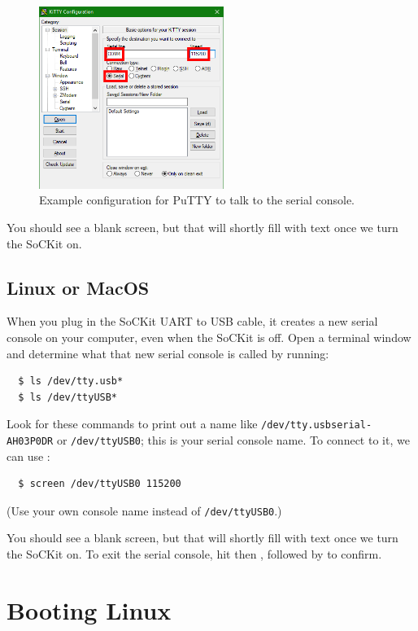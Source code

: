 \documentclass{sockitguide}
\begin{document}
\begin{figure}
  \includegraphics[width=6cm]{figures/putty.png}
  \caption{Example configuration for PuTTY to talk to the serial console.}
  \label{fig:putty}
\end{figure}

You should see a blank screen, but that will shortly fill with text
once we turn the SoCKit on.

\subsection{Linux or MacOS}

When you plug in the SoCKit UART to USB cable, it creates a new serial
console on your computer, even when the SoCKit is off. Open a terminal
window and determine what that new serial console is called by
running:
\begin{verbatim}
  $ ls /dev/tty.usb*
  $ ls /dev/ttyUSB*
\end{verbatim}

Look for these commands to print out a name like
\texttt{/dev/tty.usbserial-AH03P0DR} or \texttt{/dev/ttyUSB0}; this is
your serial console name. To connect to it, we can use :
\begin{verbatim}
  $ screen /dev/ttyUSB0 115200
\end{verbatim}
(Use your own console name instead of \texttt{/dev/ttyUSB0}.)

You should see a blank screen, but that will shortly fill with text
once we turn the SoCKit on. To exit the serial console, hit
 then , followed by  to confirm.

\section{Booting Linux}
\end{document}
